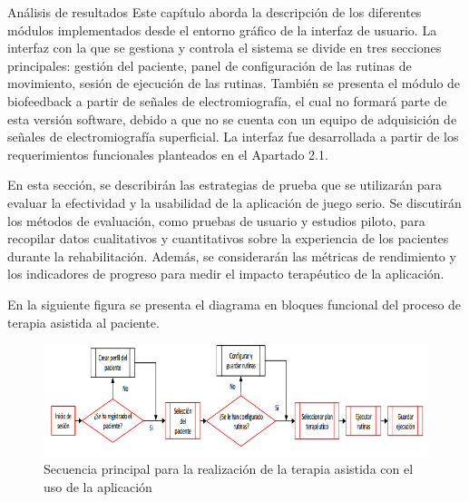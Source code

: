 \begin{thesischapter}{3} {Análisis de resultados}
    Este capítulo aborda la descripción de los diferentes módulos implementados desde el
    entorno gráfico de la interfaz de usuario. La interfaz con la que se gestiona y controla el
    sistema se divide en tres secciones principales: gestión del paciente, panel de configuración
    de las rutinas de movimiento, sesión de ejecución de las rutinas. También se presenta el
    módulo de biofeedback a partir de señales de electromiografía, el cual no formará parte de
    esta versión software, debido a que no se cuenta con un equipo de adquisición de señales de
    electromiografía superficial. La interfaz fue desarrollada a partir de los requerimientos
    funcionales planteados en el Apartado 2.1.

    \vspace{10pt}
    En esta sección, se describirán las estrategias de prueba que se utilizarán para evaluar la efectividad y la usabilidad de la aplicación de juego serio. Se discutirán los métodos de evaluación, como pruebas de usuario y estudios piloto, para recopilar datos cualitativos y cuantitativos sobre la experiencia de los pacientes durante la rehabilitación. Además, se considerarán las métricas de rendimiento y los indicadores de progreso para medir el impacto terapéutico de la aplicación.

    En la siguiente figura se presenta el diagrama en bloques funcional del proceso de terapia asistida al paciente.
    \begin{figure}[ht]
        \centering
        \includegraphics[scale=0.3]{images/diagram-therapy.png}
        \caption{Secuencia principal para la realización de la terapia asistida con el uso de la aplicación}
        \label{fig: diagram-therapy}
    \end{figure}

    
\end{thesischapter}